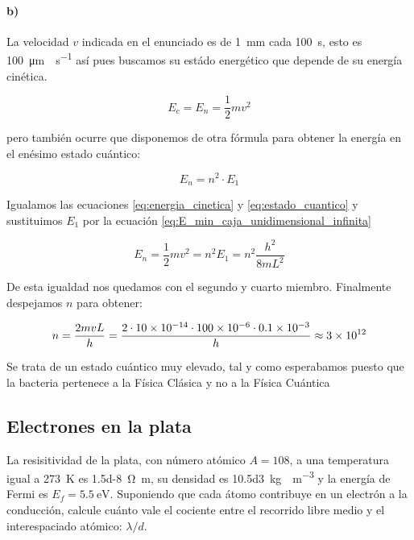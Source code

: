 \documentclass[12pt, a4paper]{article}
\begin{document}
        \paragraph{b)} La velocidad $v$ indicada en el enunciado es de \SI{1}{\milli\meter} cada \SI{100}{\second}, esto
        es \SI{100}{\micro\meter\cdot\second^{-1}} así pues buscamos su estádo energético que depende de su energía cinética.

        \begin{equation} \label{eq:energia_cinetica}
            E_c = E_n = \frac{1}{2}mv^2
        \end{equation}

        pero también ocurre que disponemos de otra fórmula para
        obtener la energía en el enésimo estado cuántico:

        \begin{equation}    \label{eq:estado_cuantico}
            E_n = n^2 \cdot E_1
        \end{equation}

        Igualamos las ecuaciones \ref{eq:energia_cinetica} y \ref{eq:estado_cuantico} y
        sustituimos $E_1$ por la ecuación \ref{eq:E_min_caja_unidimensional_infinita}

        \begin{equation*}
            E_n = \frac{1}{2}mv^2 = n^2 E_1 = n^2 \frac{h^2}{8mL^2}
        \end{equation*}

        De esta igualdad nos quedamos con el segundo y cuarto miembro.
        Finalmente despejamos $n$ para obtener:

        $$ n = \frac{2mvL}{h} = \frac{\num{2}\cdot\num{10d-14}\cdot\num{100d-6}\cdot\num{0.1d-3}}{h} \approx \num{3d12} $$

        Se trata de un estado cuántico muy elevado, tal y como esperabamos puesto que la bacteria pertenece a la
        Física Clásica y no a la Física Cuántica


        \subsection{Electrones en la plata}
        La resisitividad de la plata, con número atómico $A=\num{108}$, a una temperatura igual
        a \SI{273}{\kelvin} es \SI{1.5d-8}{\ohm\meter}, su densidad es \SI{10.5d3}{\kilo\gram\cdot\meter^{-3}}
        y la energía de Fermi es $E_f = \SI{5.5}{\electronvolt}$. Suponiendo que cada átomo contribuye
        en un electrón a la conducción, calcule cuánto vale el cociente entre el recorrido libre medio
        y el interespaciado atómico: $\lambda/d$.
\end{document}
